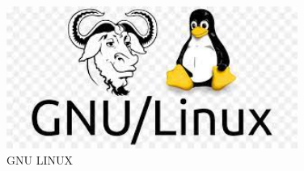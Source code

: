 \begin{figure}[htbp]
    \centering
    \includegraphics[width=0.85\textwidth]{images_pfe/gnulinux.jpeg}
    \caption{GNU LINUX }
    \label{fig:gnulinux}
\end{figure}


\clearpage







